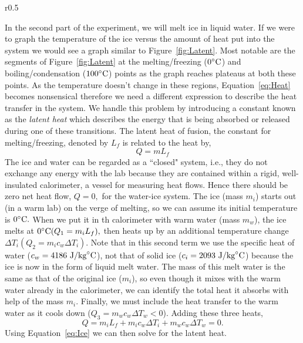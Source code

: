 \documentclass[main.tex]{subfiles}
\begin{document}
\begin{wrapfigure}{r}{0.5\textwidth}
\centering
{}
\caption{} \label{fig:Latent}
\end{wrapfigure}
In the second part of the experiment, we will melt ice in liquid water. If we were to graph the temperature of the ice versus the amount of heat put into the system we would see a graph similar to Figure~\ref{fig:Latent}. Most notable are the segments of Figure~\ref{fig:Latent} at the melting/freezing ($0\celsius$) and boiling/condensation ($100\celsius$) points as the graph reaches plateaus at both these points. As the temperature doesn't change in these regions, Equation~\eqref{eq:Heat} becomes nonsensical therefore we need a different expression to describe the heat transfer in the system. We handle this problem by introducing a constant known as the \emph{latent heat} which describes the energy that is being absorbed or released during one of these transitions. The latent heat of fusion, the constant for melting/freezing, denoted by $L_f$ is related to the heat by,
\begin{equation}
Q=mL_f
\end{equation}
The ice and water can be regarded as a ``closed" system, i.e., they do not exchange any energy with the lab because they are contained within a rigid, well-insulated calorimeter, a vessel for measuring heat flows. Hence there should be zero net heat flow, $Q=0,$ for the water-ice system. The ice (mass $m_i$) starts out (in a warm lab) on the verge of melting, so we can assume its initial temperature is $0\celsius.$ When we put it in th calorimeter with warm water (mass $m_w$), the ice melts at $0\celsius (Q_1=m_i L_f),$ then heats up by an additional temperature change $\Delta T_i (Q_2=m_i c_w \Delta T_i).$ Note that in this second term we use the specific heat of water ($c_w=4186 \text{ J}/\text{kg}\celsius$), not that of solid ice ($c_i=2093 \text{ J}/\text{kg}\celsius$) because the ice is now in the form of liquid melt water. The mass of this melt water is the same as that of the original ice ($m_i$), so even though it mixes with the warm water already in the calorimeter, we can identify the total heat it absorbs with help of the mass $m_i.$ Finally, we must include the heat transfer to the warm water as it cools down ($Q_3=m_w c_w \Delta T_w<0$). Adding these three heats,
\begin{equation} \label{eq:Ice}
Q=m_i L_f+m_i c_w \Delta T_i+m_w c_w \Delta T_w=0.
\end{equation}
Using Equation~\eqref{eq:Ice} we can then solve for the latent heat.
\end{document}
